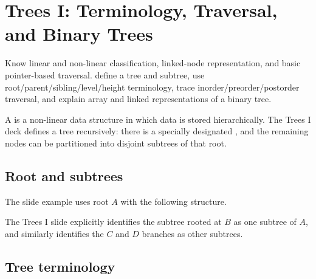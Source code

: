 \chapter{Trees I: Terminology, Traversal, and Binary Trees}
\label{ch:trees-i}

\chapterguide%
  {Know linear and non-linear classification, linked-node representation, and basic pointer-based traversal.}
  {define a tree and subtree, use root/parent/sibling/level/height terminology, trace inorder/preorder/postorder traversal, and explain array and linked representations of a binary tree.}

A  is a non-linear data structure in which data is stored hierarchically. The Trees I deck defines a tree recursively: there is a specially designated , and the remaining nodes can be partitioned into disjoint subtrees of that root.

\section{Root and subtrees}

The slide example uses root $A$ with the following structure.

\begin{mlfigure}
\end{mlfigure}

The Trees I slide explicitly identifies the subtree rooted at $B$ as one subtree of $A$, and similarly identifies the $C$ and $D$ branches as other subtrees.

\section{Tree terminology}

